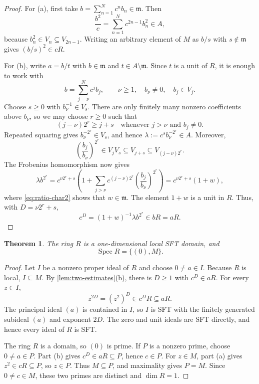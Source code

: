 \documentclass[11pt,reqno]{amsart}
\numberwithin{equation}{section}
\theoremstyle{plain}
\newtheorem{theorem}{Theorem}[section]
\theoremstyle{definition}
\theoremstyle{remark}
\newcommand{\Spec}{\operatorname{Spec}}
\newcommand{\fm}{\mathfrak m}
\begin{document}
\begin{proof}
For (a), first take $b=\sum_{n=1}^Nc^nb_n\in\fm$.  Then
\begin{equation}\label{eq:square-control}
  \frac{b^2}{c}=\sum_{n=1}^Nc^{2n-1}b_n^2\in A,
\end{equation}
because $b_n^2\in V_n\subseteq V_{2n-1}$.  Writing an arbitrary element of
$M$ as $b/s$ with $s\notin\fm$ gives $(b/s)^2\in cR$.

For (b), write $a=b/t$ with $b\in\fm$ and
$t\in A\setminus\fm$.  Since $t$ is a unit of $R$, it is enough to work
with
\[
  b=\sum_{j=\nu}^Nc^jb_j,\qquad
  \nu\geq1,\quad b_\nu\neq0,\quad b_j\in V_j.
\]
Choose $s\geq0$ with $b_\nu^{-1}\in V_s$.  There are only finitely many
nonzero coefficients above $b_\nu$, so we may choose $r\geq0$ such that
\begin{equation}\label{eq:r-choice-char2}
  (j-\nu)2^r\geq j+s
  \quad\text{whenever }j>\nu\text{ and }b_j\neq0.
\end{equation}
Repeated squaring gives $b_\nu^{-2^r}\in V_s$, and hence
$\lambda:=c^sb_\nu^{-2^r}\in A$.  Moreover,
\begin{equation}\label{eq:ratio-char2}
  \left(\frac{b_j}{b_\nu}\right)^{2^r}
  \in V_jV_s\subseteq V_{j+s}
  \subseteq V_{(j-\nu)2^r}.
\end{equation}
The Frobenius homomorphism now gives
\begin{equation}\label{eq:divisibility-char2}
  \lambda b^{2^r}=c^{\nu2^r+s}
  \left(1+\sum_{j>\nu}c^{(j-\nu)2^r}
  \left(\frac{b_j}{b_\nu}\right)^{2^r}\right)
  =c^{\nu2^r+s}(1+w),
\end{equation}
where \eqref{eq:ratio-char2} shows that $w\in\fm$.  The element $1+w$ is
a unit in $R$.  Thus, with $D=\nu2^r+s$,
\[
  c^D=(1+w)^{-1}\lambda b^{2^r}\in bR=aR.
\]
\end{proof}

\begin{theorem}\label{thm:R-char2}
The ring $R$ is a one-dimensional local SFT domain, and
\[
  \Spec R=\{(0),M\}.
\]
\end{theorem}

\begin{proof}
Let $I$ be a nonzero proper ideal of $R$ and choose $0\neq a\in I$.
Because $R$ is local, $I\subseteq M$.  By
\cref{lem:two-estimates}(b), there is $D\geq1$ with $c^D\in aR$.  For
every $z\in I$,
\[
  z^{2D}=(z^2)^D\in c^DR\subseteq aR.
\]
The principal ideal $(a)$ is contained in $I$, so $I$ is SFT with the
finitely generated subideal $(a)$ and exponent $2D$.  The zero and unit
ideals are SFT directly, and hence every ideal of $R$ is SFT.

The ring $R$ is a domain, so $(0)$ is prime.  If $P$ is a nonzero prime,
choose $0\neq a\in P$.  Part (b) gives $c^D\in aR\subseteq P$, hence
$c\in P$.  For $z\in M$, part (a) gives $z^2\in cR\subseteq P$, so
$z\in P$.  Thus $M\subseteq P$, and maximality gives $P=M$.  Since
$0\neq c\in M$, these two primes are distinct and $\dim R=1$.
\end{proof}
\end{document}

